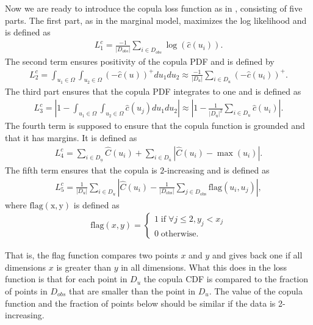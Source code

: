 Now we are ready to introduce the copula loss function as in , consisting of five parts. The first part, as in the marginal model, maximizes the log likelihood and is defined as
\begin{align*}
    L_1^c = \frac{-1}{|D_{obs}|} \sum_{i \in D_{obs}} \log(\hat{c}(u_i)).
\end{align*}
The second term ensures positivity of the copula \gls{PDF} and is defined by
\begin{align*}
    L_2^c = \int_{u_1\in\Omega}\int_{u_2\in\Omega} (-\hat{c}(u))^+du_1du_2 \approx \frac{-1}{|D_{u}|} \sum_{i \in D_{u}} (-\hat{c}(u_i))^+.
\end{align*}
The third part ensures that the copula PDF integrates to one and is defined as
\begin{align*}
    L_3^c = \left | 1- \int_{u_1\in\Omega}\int_{u_2\in\Omega} \hat{c}(u_j) du_1 du_2   \right | \approx \left | 1- \frac{1}{|D_{\mathrm{u}}|^2} \sum_{i \in D_{u}} \hat{c}(u_i)  \right |.
\end{align*}
The fourth term is supposed to ensure that the copula function is grounded and that it has margins. It is defined as
\begin{align*}
    L_4^c = \sum_{i \in D_{\underline{u}}} \hat{C}(u_i) + \sum_{i \in D_{\bar{u}}} \left| \hat{C}(u_i) - \max(u_i) \right|.
\end{align*}
The fifth term  ensures that the copula is $2$-increasing and is defined as
\begin{align*}
    L_5^c = \frac{1}{|D_{u}|} \sum_{i \in D_{u}} \left| \hat{C}(u_i) - \frac{1}{|D_{\mathrm{obs}}|}\sum_{j\in D_{\mathrm{obs}}} \mathrm{flag}(u_i,u_j) \right|,
\end{align*}
where $\mathrm{flag(x,y)}$ is defined as 
\begin{align*}
    \mathrm{flag}(x,y) =  
    \begin{cases}
        1 \; \mathrm{if} \; \forall j \leq 2, y_j < x_j\\
        0 \; \mathrm{otherwise}.
    \end{cases}
\end{align*}




That is, the flag function compares two points $x$ and $y$ and gives back one if all dimensions $x$ is greater than $y$ in all dimensions. What this does in the loss function is that for each point in $D_u$ the copula \gls{CDF} is compared to the fraction of points in $D_{obs}$ that are smaller than the point in $D_u$. The value of the copula function and the fraction of points below should be similar if the data is 2-increasing.   

